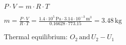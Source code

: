 \( P \cdot V = m \cdot R \cdot T \)  

\( m = \frac{P \cdot V}{R \cdot T} = \frac{1.4 \cdot 10^5 \, \text{Pa} \cdot 3.14 \cdot 10^{-3} \, \text{m}^3}{0.16628 \cdot 773.15} = 3.48 \, \text{kg} \)  

Thermal equilibrium: \( O_2 \, \text{and} \, U_2 - U_1 \)
